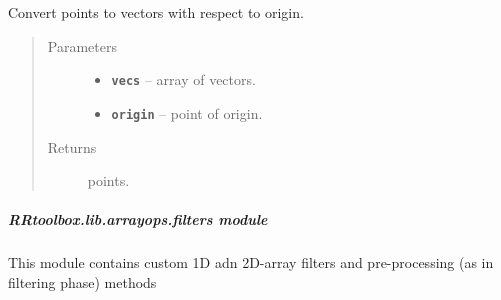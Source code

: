 \documentclass[letterpaper,10pt,english]{sphinxmanual}
\begin{document}

\begin{fulllineitems}
\label{RRtoolbox.lib.arrayops:RRtoolbox.lib.arrayops.convert.vectos2points}
Convert points to vectors with respect to origin.
\begin{quote}\begin{description}
\item[{Parameters}] \leavevmode\begin{itemize}
\item {} 
\textbf{\texttt{vecs}} -- array of vectors.

\item {} 
\textbf{\texttt{origin}} -- point of origin.

\end{itemize}

\item[{Returns}] \leavevmode
points.

\end{description}\end{quote}

\end{fulllineitems}



\subparagraph{RRtoolbox.lib.arrayops.filters module}
\label{RRtoolbox.lib.arrayops:rrtoolbox-lib-arrayops-filters-module}\label{RRtoolbox.lib.arrayops:module-RRtoolbox.lib.arrayops.filters}
This module contains custom 1D adn 2D-array filters and pre-processing (as in filtering phase) methods
\end{document}

